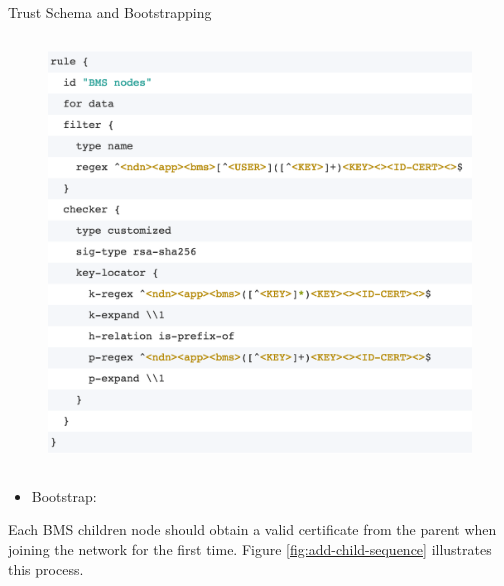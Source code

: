 \documentclass[final,hyperref={pdfpagelabels=false},20pt]{beamer}
\begin{document}
\begin{frame}[t]
\begin{columns}[t]
\begin{column}{.465\textwidth}
\begin{block}{Trust Schema and Bootstrapping}
\begin{columns}[T]
\begin{column}{.63\textwidth}
\begin{figure}
\includegraphics[width=\linewidth]{trust-schema-nodes.png}
\label{fig:trust-schema-nodes}
\end{figure}
\end{column}

\end{columns}

\vspace{18mm}

\begin{columns}[T]

\begin{column}{.26\textwidth}
\begin{itemize}
\item{Bootstrap:}
\end{itemize}
Each BMS children node should obtain a valid certificate from the parent when joining the network for the first time. Figure \ref{fig:add-child-sequence} illustrates this process.
\end{column}


\end{columns}
\end{block}
\end{column}
\end{columns}
\end{frame}
\end{document}
